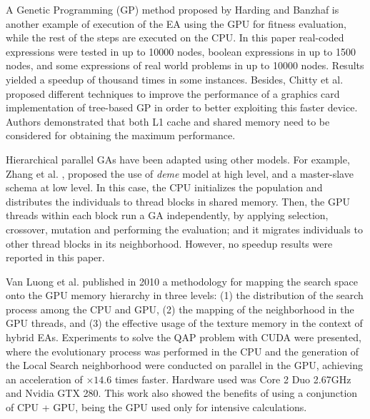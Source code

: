 \documentclass{article}
\begin{document}
A Genetic Programming (GP) method proposed by Harding and Banzhaf \cite{4215552} is another example of execution of the EA using the GPU for fitness evaluation, while the rest of the steps are executed on the CPU. In this paper real-coded expressions were tested in up to 10000 nodes, boolean expressions in up to 1500 nodes, and some expressions of real world problems in up to 10000 nodes. Results yielded a speedup of thousand times in some instances.
Besides, Chitty et al. \cite{Chitty2016} proposed different techniques to improve the performance of a graphics card implementation of tree-based GP in order to better exploiting this faster device. Authors demonstrated that both L1 cache and shared memory need to be considered for obtaining the maximum performance.

Hierarchical parallel GAs have been adapted using other models. For example, Zhang et al. \cite{ZhangImplementationMasterSlave}, proposed the use of {\em deme} model at high level, and a master-slave schema at low level. In this case, the CPU initializes the population and distributes the individuals to thread blocks in shared memory. Then, the GPU threads within each block run a GA independently, by applying selection, crossover, mutation and performing the evaluation; and it migrates individuals to other thread blocks in its neighborhood. However, no speedup results were reported in this paper.

Van Luong et al. \cite{5586403} published in 2010 a methodology for mapping the search space onto the GPU memory hierarchy in three levels: (1) the distribution of the search process among the CPU and GPU, (2) the mapping of the neighborhood in the GPU threads, and (3) the effective usage of the texture memory in the context of hybrid EAs. Experiments to solve the QAP problem with CUDA were presented, where the evolutionary process was performed in the CPU and the generation of the Local Search neighborhood were conducted on parallel in the GPU, achieving an acceleration of $\times14.6$ times faster. Hardware used was Core 2 Duo 2.67GHz and Nvidia GTX 280. This work also showed the benefits of using a conjunction of CPU + GPU, being the GPU used only for intensive calculations.

\end{document}
